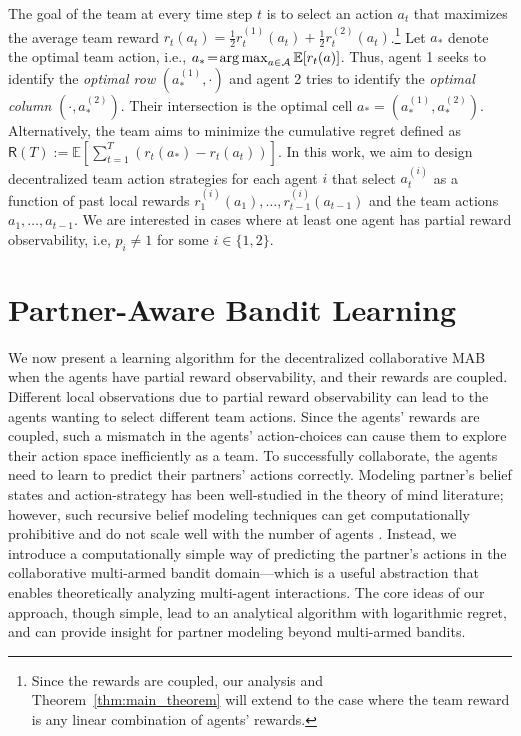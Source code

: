 \documentclass[letterpaper]{article} %
\theoremstyle{definition}
\def\expe{\mathbb{E}}   %
\def\argmax{\mathop{\rm arg\,max}}
\def\reg{\mathsf{R}}
\def\mc{\mathcal}
\begin{document}
The goal of the team at every time step $t$ is to select an action $a_t$ that maximizes the average team reward $r_t(a_t) \!=\! \frac{1}{2}r^{(1)}_t(a_t) + \frac{1}{2}r^{(2)}_t(a_t)$.\footnote{Since the rewards are coupled, our analysis and Theorem~\ref{thm:main_theorem} will extend to the case where the team reward is any linear combination of agents' rewards.} Let $a_{\ast}$ denote the optimal team action, i.e., $a_{\ast} \!=\! \argmax_{a \in \mc{A}} \expe[r_t(a)]$. Thus, agent 1 seeks to identify the \textit{optimal row}  $(a_{\ast}^{(1)}, \cdot)$ and agent 2 tries to identify the \textit{optimal column} $(\cdot, a_{\ast}^{(2)})$. Their intersection is the optimal cell $a_{\ast}\! =\! (a_{\ast}^{(1)}, a_{\ast}^{(2)})$. Alternatively, the team aims to minimize the cumulative regret defined as $\reg(T):= \expe\left[\sum_{t=1}^T \left(r_t(a_{\ast}) - r_t(a_t)\right) \right]$.
In this work, we aim to design decentralized team action strategies for each agent $i$ that select $a^{(i)}_t$ as a function of past local rewards $r^{(i)}_1(a_1), \ldots, r^{(i)}_{t-1}(a_{t-1})$ and the team actions $a_1, \ldots, a_{t-1}$. We are interested in cases where at least one agent has partial reward observability, i.e, $p_i \neq 1$ for some $i \in \{1,2\}$.





\section{Partner-Aware Bandit Learning}

We now present a learning algorithm for the decentralized collaborative MAB when the agents have partial reward observability, and their rewards are coupled.
Different local observations due to partial reward observability can lead to the agents wanting to select different team actions. Since the agents' rewards are coupled, such a mismatch in the agents' action-choices can cause them to explore their action space inefficiently as a team. To successfully collaborate, the agents need to learn to predict their partners' actions correctly. Modeling partner's belief states and action-strategy has been well-studied in the theory of mind literature; however, such recursive belief modeling techniques can get computationally prohibitive and do not scale well with the number of agents \cite{hellstrom2018understandable}. Instead, we introduce a computationally simple way of predicting the partner's actions in the collaborative multi-armed bandit domain---which is a useful abstraction that enables theoretically analyzing multi-agent interactions. The core ideas of our approach, though simple, lead to an analytical algorithm with logarithmic regret, and can provide insight for partner modeling beyond multi-armed bandits.
\end{document}
